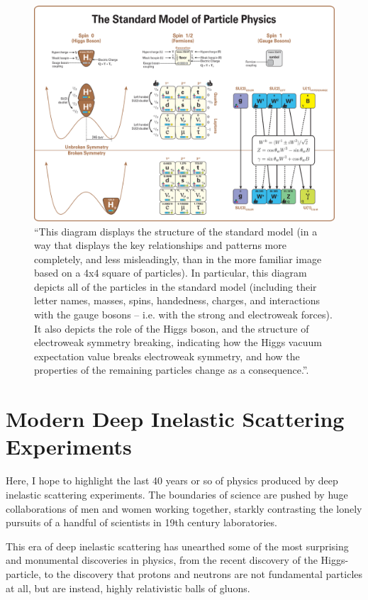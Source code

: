 \begin{figure}[ht]
	\centering
	\includegraphics[width=\linewidth]{./figures/standard_model_complete_lowres.png}
	\caption{
		``This diagram displays the structure of the standard model (in a way that
		displays the key relationships and patterns more completely, and less
		misleadingly, than in the more familiar image based on a 4x4 square of
		particles). In particular, this diagram depicts all of the particles in the
		standard model (including their letter names, masses, spins, handedness,
		charges, and interactions with the gauge bosons -- i.e. with the strong and
		electroweak forces). It also depicts the role of the Higgs boson, and the
		structure of electroweak symmetry breaking, indicating how the Higgs vacuum
		expectation value breaks electroweak symmetry, and how the properties of the
		remaining particles change as a consequence.''\cite{Boyle2014}.
	}
	\label{fig:standardmodel}
\end{figure}


\clearpage
\section{Modern Deep Inelastic Scattering Experiments}

Here, I hope to highlight the last 40 years or so of physics produced by deep
inelastic scattering experiments. The boundaries of science are pushed by huge
collaborations of men and women working together, starkly contrasting the lonely
pursuits of a handful of scientists in 19th century laboratories.

This era of deep inelastic scattering has unearthed some of the most surprising
and monumental discoveries in physics, from the recent discovery of the
Higgs-particle, to the discovery that protons and neutrons are not fundamental
particles at all, but are instead, highly relativistic balls of gluons.

